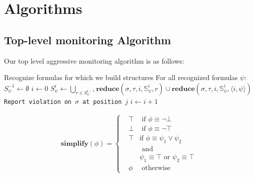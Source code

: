 \documentclass[10pt,a4paper]{article}
\newcommand{\rp}[2]{\ensuremath{\langle #1, #2 \rangle}}
\begin{document}
\section{Algorithms}
\subsection{Top-level monitoring Algorithm}
Our top level aggressive monitoring algorithm is as follows:

\begin{algorithmic}[1]
\STATE Recognize formulas for which we build structures
\STATE For all recognized formulas $\psi$: $S^{-1}_{\psi} \leftarrow \emptyset$
\STATE $i \leftarrow 0$
\LOOP
{}
	\STATE $S^i_{\psi} \leftarrow \bigcup\limits_{r \in S^{i-1}_{\psi}} \mathbf{reduce}(\sigma, \tau, i, \mathbb{S}^i_{\psi}, r) \cup \mathbf{reduce}(\sigma, \tau, i, \mathbb{S}^i_{\psi}, \rp{i}{\psi})$
\ENDFOR
\FOR{all $\rp{j}{\bot} \in S^i_{\varphi}$}
\STATE \texttt{Report violation on $\sigma$ at position $j$}
\ENDFOR
\STATE $i \leftarrow i + 1$
\ENDLOOP
\end{algorithmic}


\begin{align*}
\mathbf{simplify}(\phi) = \left\{
\begin{aligned}
&\top &\text{ if } \phi \equiv \neg \bot \\
&\bot &\text{ if } \phi \equiv \neg \top \\
&\top &\text {if } \phi \equiv \psi_1 \vee \psi_2 \\
& &\text{ and } \\ & & \psi_1 \equiv \top \text{ or } \psi_2 \equiv \top \\
&\phi &\text{ otherwise}
\end{aligned} \right. \\
\end{align*}
\end{document}
